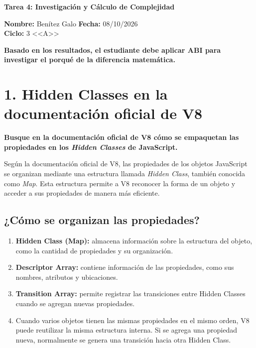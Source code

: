 \documentclass[11pt,a4paper]{article}
\begin{document}
\begin{center}
  {\Large\bfseries\color{unlblue} Tarea 4: Investigación y Cálculo de Complejidad}
\end{center}

\vspace{0.5em}

\textbf{Nombre:} Benítez Galo \hfill \textbf{Fecha:} 08/10/2026\\
\textbf{Ciclo:} 3 <<A>>

\vspace{0.5em}

\textbf{Basado en los resultados, el estudiante debe aplicar ABI para investigar el porqué de la diferencia matemática.}

\section*{1. Hidden Classes en la documentación oficial de V8}

\textbf{Busque en la documentación oficial de V8 cómo se empaquetan las propiedades en los \textit{Hidden Classes} de JavaScript.}

Según la documentación oficial de V8, las propiedades de los objetos JavaScript se organizan mediante una estructura llamada \textit{Hidden Class}, también conocida como \textit{Map}. Esta estructura permite a V8 reconocer la forma de un objeto y acceder a sus propiedades de manera más eficiente.

\subsection*{¿Cómo se organizan las propiedades?}

\begin{enumerate}[leftmargin=*]
  \item \textbf{Hidden Class (Map):} almacena información sobre la estructura del objeto, como la cantidad de propiedades y su organización.
  \item \textbf{Descriptor Array:} contiene información de las propiedades, como sus nombres, atributos y ubicaciones.
  \item \textbf{Transition Array:} permite registrar las transiciones entre Hidden Classes cuando se agregan nuevas propiedades.
  \item Cuando varios objetos tienen las mismas propiedades en el mismo orden, V8 puede reutilizar la misma estructura interna. Si se agrega una propiedad nueva, normalmente se genera una transición hacia otra Hidden Class.
\end{enumerate}
\end{document}
